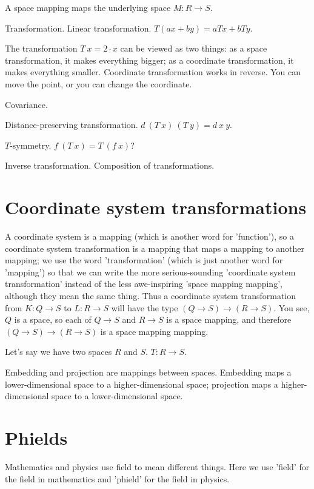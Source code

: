 A space mapping maps the underlying space $M : R \to S$.

Transformation.
Linear transformation.
$T(ax+by) = aTx + bTy$.

The transformation $T~x = 2\cdot x$ can be viewed as two things:
as a space transformation, it makes everything bigger;
as a coordinate transformation, it makes everything smaller.
Coordinate transformation works in reverse.
You can move the point, or you can change the coordinate.

Covariance.

Distance-preserving transformation.
$d~(T~x)~(T~y) = d~x~y$.

$T$-symmetry.
$f~(T~x) = T~(f~x)$?

Inverse transformation.
Composition of transformations.

\section{Coordinate system transformations}

A coordinate system is a mapping (which is another word for 'function'),
so a coordinate system transformation is a mapping that maps a mapping to another mapping;
we use the word 'transformation' (which is just another word for 'mapping') so that
we can write the more serious-sounding 'coordinate system transformation'
instead of the less awe-inspiring 'space mapping mapping',
although they mean the same thing.
Thus a coordinate system transformation
from $K : Q \to S$ to $L : R \to S$ will have the type
$(Q \to S) \to (R \to S)$.
You see, $Q$ is a space,
so each of $Q \to S$ and $R \to S$ is a space mapping,
and therefore $(Q \to S) \to (R \to S)$ is a space mapping mapping.

Let's say we have two spaces $R$ and $S$.
$T : R \to S$.

Embedding and projection are mappings between spaces.
Embedding maps a lower-dimensional space to a higher-dimensional space;
projection maps a higher-dimensional space to a lower-dimensional space.

\section{Phields}

Mathematics and physics use field to mean different things.
Here we use 'field' for the field in mathematics
and 'phield' for the field in physics.

